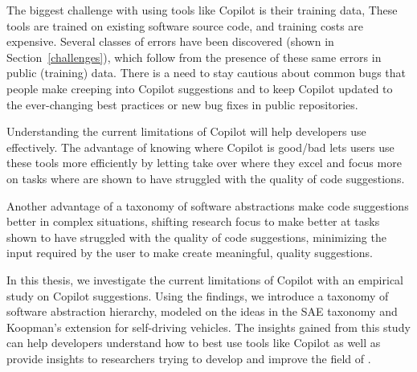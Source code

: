The biggest challenge with using tools like Copilot is their training data, These tools are trained on existing software source code, and training costs are expensive.
Several classes of errors have been discovered (shown in Section~\ref{challenges}), which follow from the presence of these same errors in public (training) data. There is a need to stay cautious about common bugs that people make creeping into Copilot suggestions and to keep Copilot updated to the ever-changing best practices or new bug fixes in public repositories.

Understanding the current limitations of Copilot will help developers use \cct{} effectively. The advantage of knowing where Copilot is good/bad lets users use these tools more efficiently by letting \cct{} take over where they excel and focus more on tasks where \cct{} are shown to have struggled with the quality of code suggestions.

Another advantage of a taxonomy of software abstractions make code suggestions better in complex situations, shifting research focus to make \cct{} better at tasks shown to have struggled with the quality of code suggestions, minimizing the input required by the user to make \cct{} create meaningful, quality suggestions.

In this thesis, we investigate the current limitations of Copilot with an empirical study on Copilot suggestions. Using the findings, we introduce a taxonomy of software abstraction hierarchy, modeled on the ideas in the SAE taxonomy and Koopman's extension for self-driving vehicles. The insights gained from this study can help developers understand how to best use tools like Copilot as well as provide insights to researchers trying to develop and improve the field of \cct{}.





